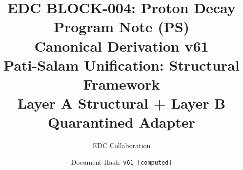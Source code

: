 \documentclass[11pt,a4paper]{article}
\theoremstyle{definition}
\begin{document}

\title{%
  \textbf{EDC BLOCK-004: Proton Decay Program Note (PS)}\\[0.5em]
  \Large Canonical Derivation v61\\[0.3em]
  \large Pati-Salam Unification: Structural Framework\\[0.3em]
  \normalsize Layer A Structural + Layer B Quarantined Adapter
}

\author{EDC Collaboration}
\date{Document Hash: \texttt{v61-[computed]}}

\maketitle

\end{document}
